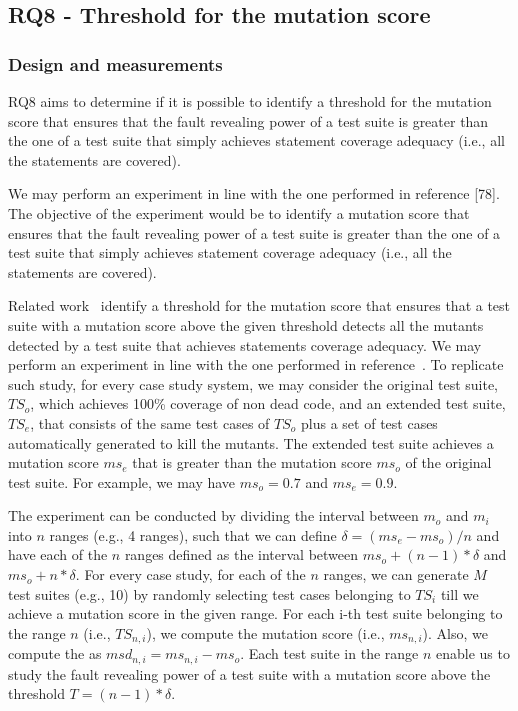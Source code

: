 




\clearpage
\subsection{RQ8 - Threshold for the mutation score}
\label{sec:exp:thr}
\subsubsection{Design and measurements}


RQ8 aims to determine if it is possible to identify a threshold for the mutation score that ensures that the fault revealing power of a test suite is greater than the one of a test suite that simply achieves statement coverage adequacy (i.e., all the statements are covered).


We may perform an experiment in line with the one performed in reference [78]. The objective of the experiment would be to identify a mutation score that ensures that the fault revealing power of a test suite is greater than the one of a test suite that simply achieves statement coverage adequacy (i.e., all the statements are covered).

Related work~\cite{CChekam:17} identify a threshold for the mutation score that ensures that a test suite with a mutation score above the given threshold detects all the mutants detected by a test suite that achieves statements coverage adequacy.
We may perform an experiment in line with the one performed in reference~\cite{CChekam:17}.
To replicate such study, for every case study system, we may consider the original test suite, $\mathit{TS}_o$, which achieves 100\% coverage of non dead code, and an extended test suite, $\mathit{TS}_e$, that consists of the same test cases of $\mathit{TS}_o$ plus a set of test cases automatically generated to kill the mutants. The extended test suite achieves a mutation score $ms_e$ that is greater than the mutation score $\mathit{ms}_o$ of the original test suite. For example, we may have $\mathit{ms}_o=0.7$ and $\mathit{ms}_e=0.9$.

The experiment can be conducted by dividing the interval between $m_o$ and $m_i$ into $n$ ranges (e.g., 4 ranges), such that we can define $\delta = (\mathit{ms}_e - \mathit{ms}_o)/n$ and have each of the $n$ ranges defined as the interval between $\mathit{ms}_o+(n-1)*\delta$ and $\mathit{ms}_o+n*\delta$.
For every case study, for each of the $n$ ranges, we can generate $M$ test suites  (e.g., 10) by randomly selecting test cases belonging to $\mathit{TS}_i$ till we achieve a mutation score in the given range.
For each i-th test suite belonging to the range $n$ (i.e., $\mathit{TS}_{n,i}$), we compute the mutation score (i.e., $ms_{n,i}$).
Also, we compute the  as $msd_{n,i}=ms_{n,i}-ms_o$. Each test suite in the range $n$ enable us to study the fault revealing power of a test suite with a mutation score above the threshold $T=(n-1)*\delta$.

